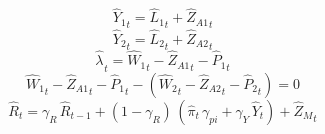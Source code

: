 \begin{dmath}
{{\hat{Y}_{1}}}_{t}={{\hat{L}_{1}}}_{t}+{{\hat{Z}_{A1}}}_{t}
\end{dmath}
\begin{dmath}
{{\hat{Y}_{2}}}_{t}={{\hat{L}_{2}}}_{t}+{{\hat{Z}_{A2}}}_{t}
\end{dmath}
\begin{dmath}
{{\hat{\lambda}_{}}}_{t}={{\hat{W}_{1}}}_{t}-{{\hat{Z}_{A1}}}_{t}-{{\hat{P}_{1}}}_{t}
\end{dmath}
\begin{dmath}
{{\hat{W}_{1}}}_{t}-{{\hat{Z}_{A1}}}_{t}-{{\hat{P}_{1}}}_{t}-\left({{\hat{W}_{2}}}_{t}-{{\hat{Z}_{A2}}}_{t}-{{\hat{P}_{2}}}_{t}\right)=0
\end{dmath}
\begin{dmath}
{{\hat{R}}}_{t}={{\gamma_{R}}}\, {{\hat{R}}}_{t-1}+\left(1-{{\gamma_{R}}}\right)\, \left({{\hat{\pi}}}_{t}\, {{\gamma_{pi}}}+{{\gamma_{Y}}}\, {{\hat{Y}}}_{t}\right)+{{\hat{Z}_M}}_{t}
\end{dmath}
